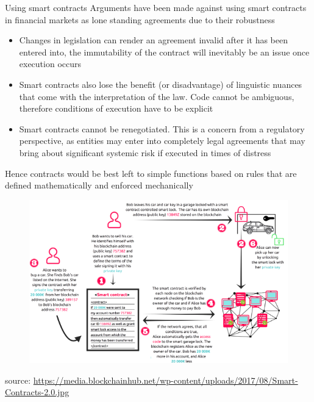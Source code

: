 \documentclass[10pt]{beamer}
\begin{document}


\begin{frame}{Using smart contracts}
	Arguments have been made against using smart contracts in financial markets as lone standing agreements due to their robustness
	\begin{itemize}
		\item Changes in legislation can render an agreement invalid after it has been entered into, the immutability of the contract will inevitably be an issue once execution occurs
		\item Smart contracts also lose the benefit (or disadvantage) of linguistic nuances that come with the interpretation of the law. Code cannot be ambiguous, therefore conditions of execution have to be explicit
		\item Smart contracts cannot be renegotiated. This is a concern from a regulatory perspective, as entities may enter into completely legal agreements that may bring about significant systemic risk if executed in times of distress
	\end{itemize}
	Hence contracts would be best left to simple functions based on rules that are defined mathematically and enforced mechanically
\end{frame}





\begin{frame}
	\begin{figure}[]
		\centering
		\includegraphics  [scale=0.5]{Images/smart4}
	\end{figure}
	\begin{scriptsize}
		source: \href{https://blockchainhub.net/blog/infographics/smart-contracts-explained/}{https://media.blockchainhub.net/wp-content/uploads/2017/08/Smart-Contracts-2.0.jpg}
	\end{scriptsize}
\end{frame}
\end{document}
